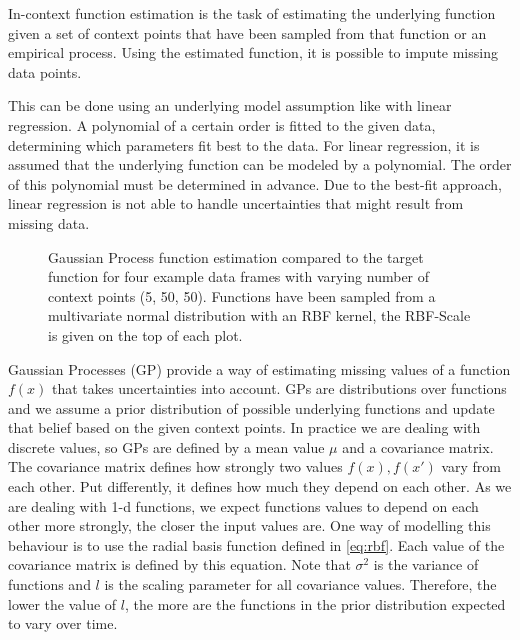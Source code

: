 In-context function estimation is the task of estimating the underlying function given a set of context points that have been sampled from that function or an empirical process. Using the estimated function, it is possible to impute missing data points. \cite{seifner2025zeroshotimputationfoundationinference}

This can be done using an underlying model assumption like with linear regression. A polynomial of a certain order is fitted to the given data, determining which parameters fit best to the data. For linear regression, it is assumed that the underlying function can be modeled by a polynomial. The order of this polynomial must be determined in advance. Due to the best-fit approach, linear regression is not able to handle uncertainties that might result from missing data.

\begin{figure*}
	\centering
	\resizebox{0.90\textwidth}{!}{
		
		
		
	}
	\caption{Gaussian Process function estimation compared to the target function for four example data frames with varying number of context points (5, 50, 50). Functions have been sampled from a multivariate normal distribution with an RBF kernel, the RBF-Scale is given on the top of each plot. }
	\label{fig:gaussian}
\end{figure*}

Gaussian Processes (GP) provide a way of estimating missing values of a function $f(x)$ that takes uncertainties into account. GPs are distributions over functions and we assume a prior distribution of possible underlying functions and update that belief based on the given context points. In practice we are dealing with discrete values, so GPs are defined by a mean value $\mu$ and a covariance matrix. The covariance matrix defines how strongly two values $f(x),f(x')$ vary from each other. Put differently, it defines how much they depend on each other. As we are dealing with 1-d functions, we expect functions values to depend on each other more strongly, the closer the input values are. One way of modelling this behaviour is to use the radial basis function defined in \autoref{eq:rbf}. Each value of the covariance matrix is defined by this equation. Note that $\sigma^2$ is the variance of functions and $l$ is the scaling parameter for all covariance values. Therefore, the lower the value of $l$, the more are the functions in the prior distribution expected to vary over time. \cite{garnelo2018neural, williams2006gaussian}

